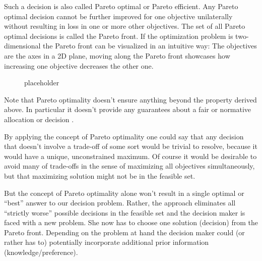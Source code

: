 	Such a decision is also called Pareto optimal or Pareto efficient.
	Any Pareto optimal decision cannot be further improved for one objective unilaterally without resulting in loss in one or more other objectives.
	The set of all Pareto optimal decisions is called the Pareto front.
	If the optimization problem is two-dimensional the Pareto front can be visualized in an intuitive way:
	The objectives are the axes in a 2D plane, moving along the Pareto front showcases how increasing one objective decreases the other one.

	\begin{figure}
	\begin{center}
			
	\caption{placeholder}
	\end{center}
	\end{figure}

	Note that Pareto optimality doesn't ensure anything beyond the property derived above.
	In particular it doesn't provide any guarantees about a fair or normative allocation or decision \cite{van2007ethics}.
	
	By applying the concept of Pareto optimality one could say that any decision that doesn't involve a trade-off of some sort would be trivial to resolve, because it would have a unique, unconstrained maximum.
	Of course it would be desirable to avoid many of trade-offs in the sense of maximizing all objectives simultaneously, but that maximizing solution might not be in the feasible set.

	\idea{\dots}

	But the concept of Pareto optimality alone won't result in a single optimal or \enquote{best} answer to our decision problem.
	Rather, the approach eliminates all \enquote{strictly worse} possible decisions in the feasible set and the decision maker is faced with a new problem.
	She now has to choose one solution (decision) from the Pareto front.
	Depending on the problem at hand the decision maker could (or rather has to) potentially incorporate additional prior information (knowledge/preference).

